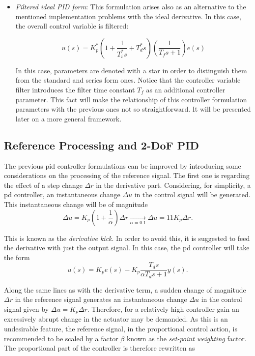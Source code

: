 \begin{itemize}
\item \emph{Filtered ideal PID form}: This formulation arises also as an alternative to the mentioned implementation problems with the ideal derivative. In this case, the overall control variable is filtered:

\begin{equation}
	u(s) =  K^*_p \left(1+ \frac{1}{T^*_i s} + T^*_d s  \right) \left(\frac{1}{T_f s+1}\right) e(s)	
\end{equation} 

In this case, parameters are denoted with a star in order to distinguish them from the standard and series form ones. Notice that the controller variable filter introduces the filter time constant $T_f$ as an additional controller parameter. This fact will make the relationship of this controller formulation parameters with the previous ones not so straightforward. It will be presented later on a more general framework. 
\end{itemize}
%
\subsection{Reference Processing and 2-DoF PID}
\label{sec:3.2}
The previous \gls{pid} controller formulations can be improved by introducing some considerations on the processing of the reference signal. The first one is regarding the effect of a step change $\Delta r$ in the derivative part. Considering, for simplicity, a \gls{pd} controller, an instantaneous change $\Delta u$ in the control signal will be generated. This instantaneous change will be of magnitude
%
\begin{equation}
\Delta u = K_p \left ( 1 +\frac{1}{\alpha} \right ) \Delta r \xrightarrow[\alpha=0.1]{}\Delta u = 11 K_p \Delta r.
\end{equation} 

This is known as the \emph{derivative kick}. In order to avoid this, it is suggested to feed the derivative with just the output signal.  In this case, the \gls{pd} controller will take the form
%
\begin{equation}
u(s)=K_p e(s) - K_p\frac{T_ds}{\alpha T_d s+1} y(s).
\end{equation}

Along the same lines as with the derivative term, a sudden change of magnitude $\Delta r$ in the reference signal generates an instantaneous change $\Delta u$ in the control signal given by $\Delta u = K_p \Delta r$. Therefore, for a relatively high controller gain an excessively abrupt change in the actuator may be demanded. As this is an undesirable feature, the reference signal, in the proportional control action, is recommended to be scaled by a factor $\beta$ known as the \emph{set-point weighting} factor. The proportional part of the controller is therefore rewritten as

